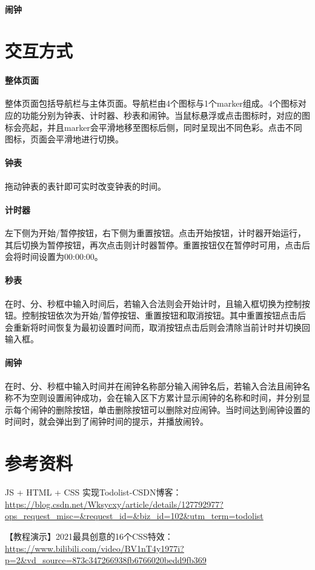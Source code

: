 \documentclass[UTF8]{ctexart}
\begin{document}
	\paragraph{闹钟}
	
	
	\section{交互方式} %
	\paragraph{整体页面}
	整体页面包括导航栏与主体页面。导航栏由4个图标与1个marker组成。4个图标对应的功能分别为钟表、计时器、秒表和闹钟。当鼠标悬浮或点击图标时，对应的图标会亮起，并且marker会平滑地移至图标后侧，同时呈现出不同色彩。点击不同图标，页面会平滑地进行切换。
	\paragraph{钟表}
	拖动钟表的表针即可实时改变钟表的时间。

	\paragraph{计时器}
	左下侧为开始/暂停按钮，右下侧为重置按钮。点击开始按钮，计时器开始运行，其后切换为暂停按钮，再次点击则计时器暂停。重置按钮仅在暂停时可用，点击后会将时间设置为00:00:00。
	\paragraph{秒表}
	在时、分、秒框中输入时间后，若输入合法则会开始计时，且输入框切换为控制按钮。控制按钮依次为开始/暂停按钮、重置按钮和取消按钮。其中重置按钮点击后会重新将时间恢复为最初设置时间而，取消按钮点击后则会清除当前计时并切换回输入框。
	\paragraph{闹钟}
	在时、分、秒框中输入时间并在闹钟名称部分输入闹钟名后，若输入合法且闹钟名称不为空则设置闹钟成功，会在输入区下方累计显示闹钟的名称和时间，并分别显示每个闹钟的删除按钮，单击删除按钮可以删除对应闹钟。当时间达到闹钟设置的时间时，就会弹出到了闹钟时间的提示，并播放闹铃。
	

	
	\section{参考资料} %
	JS + HTML + CSS 实现Todolist-CSDN博客： \url{https://blog.csdn.net/Wksycxy/article/details/127792977?ops_request_misc=&request_id=&biz_id=102&utm_term=todolist}

	
	【教程演示】2021最具创意的16个CSS特效：\url{https://www.bilibili.com/video/BV1nT4y1977i?p=2&vd_source=873c347266938fb6766020bedd9fb369}
\end{document}
